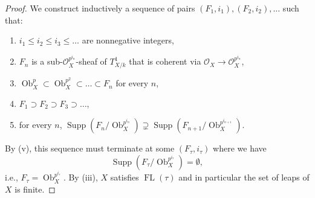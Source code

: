\documentclass{amsart}
\newcommand{\FL}[1]{\operatorname{FL}(#1)}
\begin{document}
\begin{proof}
    We construct inductively a sequence of pairs $(F_1,i_1),(F_2,i_2),\dots$ such that:
    \begin{enumerate}
        \item $i_1\le i_2\le i_3\le \dots$ are nonnegative integers,
        \item $F_n$ is a sub-$\mathcal{O}_X^{p^{i_n}}$-sheaf of $T_{X/k}^1$ that is coherent via $\mathcal{O}_X\to\mathcal{O}_X^{p^{i_n}}$,
        \item $\operatorname{Ob}_X^{p}\subset\operatorname{Ob}_X^{p^2}\subset \dots \subset F_n$ for every $n$,
        \item $F_1\supset F_2\supset F_3\supset \dots$,
        \item for every $n$, $\operatorname{Supp}(F_n/\operatorname{Ob}_X^{p^{i_n}})\supsetneq \operatorname{Supp}(F_{n+1}/\operatorname{Ob}_X^{p^{i_{n+1}}})$.
    \end{enumerate}
    By (v), this sequence must terminate at some $(F_\tau,i_\tau)$ where we have $$\operatorname{Supp}(F_\tau/\operatorname{Ob}_X^{p^{i_\tau}})=\emptyset,$$ i.e., $F_\tau=\operatorname{Ob}_X^{p^{i_\tau}}$. By (iii), $X$ satisfies $\FL{\tau}$ and in particular the set of leaps of $X$ is finite.


\end{proof}
\end{document}
